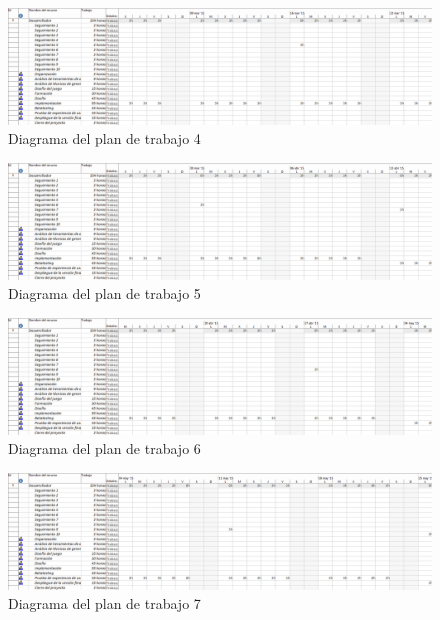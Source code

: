 \begin{figure}[!htp]
	\centering
	\includegraphics[page=4, scale=.5, angle=90]{fig/Plan4}
	\caption{Diagrama del plan de trabajo 4}
\end{figure}

\begin{figure}[!htp]
	\centering
	\includegraphics[page=5, scale=.5, angle=90]{fig/Plan5}
	\caption{Diagrama del plan de trabajo 5}
\end{figure}

\begin{figure}[!htp]
	\centering
	\includegraphics[page=6, scale=.5, angle=90]{fig/Plan6}
	\caption{Diagrama del plan de trabajo 6}
\end{figure}

\begin{figure}[!htp]
	\centering
	\includegraphics[page=7, scale=.5, angle=90]{fig/Plan7}
	\caption{Diagrama del plan de trabajo 7}
\end{figure}

